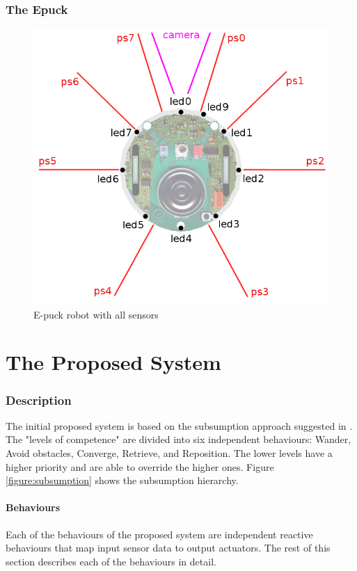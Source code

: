 \documentclass[a4paper]{article}
\begin{document}
\section{The Epuck}

\begin{figure}[H]
\centering
\includegraphics[scale=0.2]{e-puck_sensors_and_leds.png}
\caption{E-puck robot with all sensors}
\end{figure}

\part{The Proposed System}

\section{Description}

The initial proposed system is based on the subsumption approach suggested in \cite{assignment}.
The "levels of competence" are divided into six independent behaviours: Wander, Avoid obstacles, Converge, Retrieve, and Reposition.
The lower levels have a higher priority and are able to override the higher ones.
Figure \vref{figure:subsumption} shows the subsumption hierarchy.



\subsection{Behaviours}
Each of the behaviours of the proposed system are independent reactive behaviours that map input sensor data to output actuators. The rest of this section describes each of the behaviours in detail.
\end{document}
